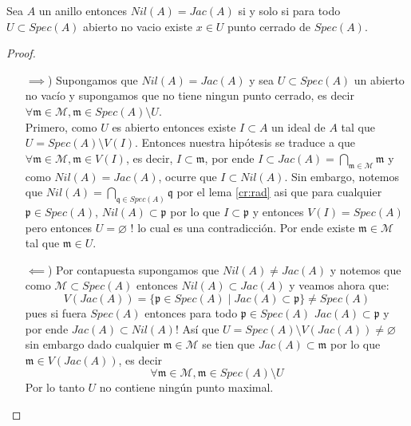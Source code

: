 \documentclass[14pt]{extarticle}
\begin{document}
\begin{proposicion}{}{}
    Sea $A$ un anillo entonces
    $Nil(A)=Jac(A)$ si y solo si 
    para todo $U \subset Spec(A)$ abierto no vacio
    existe $x \in U$ punto cerrado de $Spec(A)$.
\end{proposicion}
\begin{proof}
    \begin{enumerate}
        \item[$\implies$)] Supongamos que $Nil(A) = Jac(A)$
        y sea $U \subset Spec(A)$ un abierto no vacío y supongamos
        que no tiene ningun punto cerrado, es decir 
        $\forall \mathfrak{m} \in \mathcal{M},
        \mathfrak{m} \in Spec(A) \setminus U$.\\
        Primero, como $U$ es abierto entonces existe $I \subset A$
        un ideal de $A$ tal que $U= Spec(A)\setminus V(I)$.
        Entonces nuestra hipótesis se traduce a que 
        $\forall \mathfrak{m} \in \mathcal{M},
        \mathfrak{m} \in V(I)$, es decir, $I \subset \mathfrak{m}$,
        por ende $I \subset Jac(A)= \bigcap_{\mathfrak{m}\in \mathcal{M}}\mathfrak{m}$
        y como $Nil(A)=Jac(A)$, ocurre que $I \subset Nil(A)$.
        Sin embargo, notemos que $Nil(A) = \bigcap_{\mathfrak{q}\in Spec(A)}\mathfrak{q}$ 
        por el lema \ref{cr:rad} asi que para cualquier $\mathfrak{p}\in Spec(A)$,
        $Nil(A) \subset \mathfrak{p}$ por lo que $I \subset \mathfrak{p}$ y entonces $V(I)=Spec(A)$
        pero entonces $U = \varnothing$ ! lo cual es una contradicción.
        Por ende existe $\mathfrak{m}\in \mathcal{M}$ tal que $\mathfrak{m} \in U$.
        \item[$\impliedby$)] Por contapuesta supongamos que $Nil(A)\neq Jac(A)$
        y notemos que como $\mathcal{M} \subset Spec(A)$ entonces $Nil(A) \subset Jac(A)$
        y veamos ahora que:
        $$V(Jac(A))=\{\mathfrak{p}\in Spec(A)\mid Jac(A)\subset \mathfrak{p}\}\neq Spec(A)$$
        pues si fuera $Spec(A)$ entonces para todo $\mathfrak{p}\in Spec(A)$
        $Jac(A)\subset \mathfrak{p}$ y por ende $Jac(A)\subset Nil(A)$!
        Así que $U = Spec(A)\setminus V(Jac(A)) \neq \varnothing$
        sin embargo dado cualquier $\mathfrak{m}\in \mathcal{M}$ se tien que
        $Jac(A)\subset \mathfrak{m}$ por lo que $\mathfrak{m}\in V(Jac(A))$, 
        es decir 
        $$\forall\mathfrak{m}\in\mathcal{M}, \mathfrak{m}\in Spec(A)\setminus U$$
        Por lo tanto $U$ no contiene ningún punto maximal.
    \end{enumerate}
\end{proof}
\end{document}
